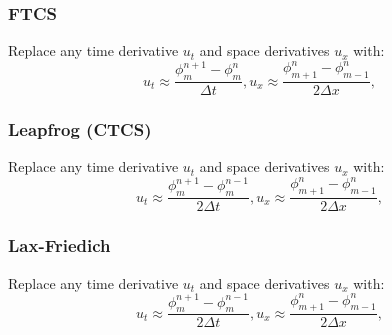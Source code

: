 \documentclass[doc]{apa}
\begin{document}
\subsubsection{FTCS}

Replace any time derivative $u_t$ and space derivatives $u_x$ with:
\begin{equation}
u_t \approx \frac{\phi_m^{n+1} - \phi_m^{n}}{\Delta t}, u_x \approx \frac{\phi_{m+1}^n - \phi_{m-1}^n}{2 \Delta x}, 
\end{equation}

\subsubsection{Leapfrog (CTCS) }
Replace any time derivative $u_t$ and space derivatives $u_x$ with:
\begin{equation}
u_t \approx \frac{\phi_m^{n+1} - \phi_m^{n-1}}{2 \Delta t}, u_x \approx \frac{\phi_{m+1}^n - \phi_{m-1}^n}{2 \Delta x}, 
\end{equation}

\subsubsection{Lax-Friedich}
Replace any time derivative $u_t$ and space derivatives $u_x$ with:
\begin{equation}
u_t \approx \frac{\phi_m^{n+1} - \phi_m^{n-1}}{2 \Delta t}, u_x \approx \frac{\phi_{m+1}^n - \phi_{m-1}^n}{2 \Delta x}, 
\end{equation}
\end{document}

